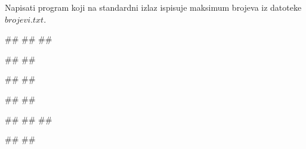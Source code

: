 \begin{Exercise}[label=p3_05] 
 Napisati program koji na standardni izlaz ispisuje maksimum brojeva iz datoteke $brojevi.txt$. \\
\begin{minitest}
\begin{upotreba}{1}
##
##
##

#\naslovIzlaz#
##
\end{upotreba}
\end{minitest}
\begin{minitest}
\begin{upotreba}{2}
##
##

#\naslovIzlaz#
##
\end{upotreba}
\end{minitest}
\begin{minitest}
\begin{upotreba}{3}
##
##
##

#\naslovIzlaz#
##
\end{upotreba}
\end{minitest}
\end{Exercise}
\begin{Answer}[ref=p3_05]
\end{Answer}

